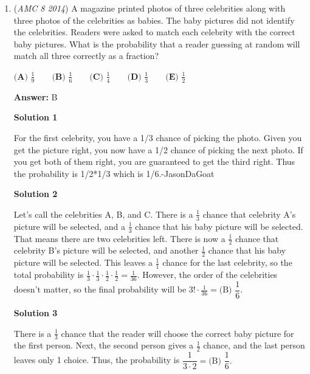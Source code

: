 \begin{enumerate}
 


 Note: This is not recommended in more complicated problems (e.g. Jill's house is 1000 blocks east and 400 blocks north of Jack's house).

 


	\item (\textit{AMC 8 2014}) A magazine printed photos of three celebrities along with three photos of the celebrities as babies. The baby pictures did not identify the celebrities. Readers were asked to match each celebrity with the correct baby pictures. What is the probability that a reader guessing at random will match all three correctly as a fraction?


 $\textbf{(A) }\frac{1}{9}\qquad\textbf{(B) }\frac{1}{6}\qquad\textbf{(C) }\frac{1}{4}\qquad\textbf{(D) }\frac{1}{3}\qquad\textbf{(E) }\frac{1}{2}$

 \textbf{Answer: }B



\textbf{Solution 1}

For the first celebrity, you have a 1/3 chance of picking the photo. Given you get the picture right, you now have a 1/2 chance of picking the next photo. If you get both of them right, you are guaranteed to get the third right. Thus the probability is 1/2*1/3 which is 1/6.-JasonDaGoat

 



\textbf{Solution 2}

Let's call the celebrities A, B, and C. There is a $\frac{1}{3}$ chance that celebrity A's picture will be selected, and a $\frac{1}{3}$ chance that his baby picture will be selected. That means there are two celebrities left. There is now a $\frac{1}{2}$ chance that celebrity B's picture will be selected, and another $\frac{1}{2}$ chance that his baby picture will be selected. This leaves a $\frac{1}{1}$ chance for the last celebrity, so the total probability is $\frac{1}{3}\cdot \frac{1}{3}\cdot \frac{1}{2}\cdot \frac{1}{2}=\frac{1}{36}$. However, the order of the celebrities doesn't matter, so the final probability will be $3!\cdot \frac{1}{36}=\boxed{\text{(B) }\dfrac{1}{6}}.$




\textbf{Solution 3}

There is a $\frac{1}{3}$ chance that the reader will choose the correct baby picture for the first person. Next, the second person gives a $\frac{1}{2}$ chance, and the last person leaves only 1 choice. Thus, the probability is $\dfrac{1}{3\cdot 2}=\boxed{\text{(B) }\dfrac{1}{6}}.$





\end{enumerate}
